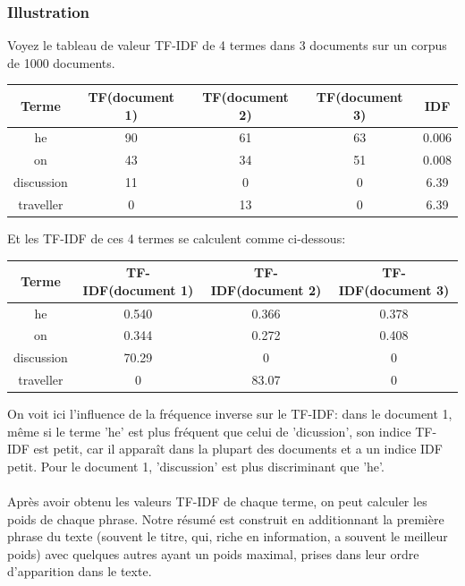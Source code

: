 \documentclass[a4paper, 12pt]{article}
\begin{document}
\subsubsection{Illustration}
Voyez le tableau de valeur TF-IDF de 4 termes dans 3 documents sur un corpus de 1000 documents.
\begin{center}
	\begin{tabular}{|c|c|c|c|c|}
	 \hline
	 	Terme & TF(document 1) & TF(document 2) & TF(document 3) & IDF \\
	 \hline
	 	he & 90 & 61 & 63 & 0.006 \\
	 \hline
	 	on & 43 & 34 & 51 & 0.008 \\
	 \hline
	 	discussion & 11 & 0 & 0 & 6.39 \\
	 \hline
	 	traveller & 0 & 13 & 0 & 6.39 \\
	 \hline
	\end{tabular}
\end{center}

Et les TF-IDF de ces 4 termes se calculent comme ci-dessous:

\begin{center}
	\begin{tabular}{|c|c|c|c|}
	 \hline
	 	Terme & TF-IDF(document 1) & TF-IDF(document 2) & TF-IDF(document 3) \\
	 \hline
	 	he & 0.540 & 0.366 & 0.378 \\
	 \hline
	 	on & 0.344 & 0.272 & 0.408 \\
	 \hline
	 	discussion & 70.29 & 0 & 0 \\
	 \hline
	 	traveller & 0 & 83.07 & 0 \\
	 \hline
	\end{tabular}
\end{center}

On voit ici l'influence de la fréquence inverse sur le TF-IDF: dans le document 1, même si le terme 'he' est plus fréquent que celui de 'dicussion', son indice TF-IDF est petit, car il apparaît dans la plupart des documents et a un indice IDF petit. Pour le document 1, 'discussion' est plus discriminant que 'he'.

\paragraph{}
Après avoir obtenu les valeurs TF-IDF de chaque terme, on peut calculer les poids de chaque phrase. Notre résumé est construit en additionnant la première phrase du texte (souvent le titre, qui, riche en information, a souvent le meilleur poids) avec quelques autres ayant un poids maximal, prises dans leur ordre d'apparition dans le texte.
\end{document}

